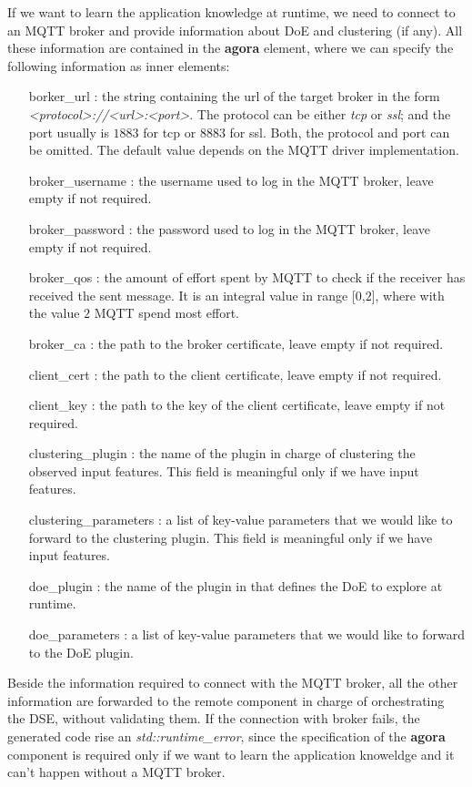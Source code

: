 If we want to learn the application knowledge at runtime, we need to connect to an MQTT broker and provide information about DoE and clustering (if any).
All these information are contained in the \textbf{agora} element, where we can specify the following information as inner elements:
\begin{itemize}
	\item[borker\_url]: the string containing the url of the target broker in the form \textit{<protocol>://<url>:<port>}. The protocol can be either \textit{tcp} or \textit{ssl}; and the port usually is $1883$ for tcp or $8883$ for ssl. Both, the protocol and port can be omitted. The default value depends on the MQTT driver implementation.
	\item[broker\_username]: the username used to log in the MQTT broker, leave empty if not required.
	\item[broker\_password]: the password used to log in the MQTT broker, leave empty if not required.
	\item[broker\_qos]: the amount of effort spent by MQTT to check if the receiver has received the sent message. It is an integral value in range [$0$,$2$], where with the value $2$ MQTT spend most effort.
	\item[broker\_ca]: the path to the broker certificate, leave empty if not required.
	\item[client\_cert]: the path to the client certificate, leave empty if not required.
	\item[client\_key]: the path to the key of the client certificate, leave empty if not required.
	\item[clustering\_plugin]: the name of the plugin in charge of clustering the observed input features. This field is meaningful only if we have input features.
	\item[clustering\_parameters]: a list of key-value parameters that we would like to forward to the clustering plugin. This field is meaningful only if we have input features.
	\item[doe\_plugin]: the name of the plugin in that defines the DoE to explore at runtime.
	\item[doe\_parameters]: a list of key-value parameters that we would like to forward to the DoE plugin.
\end{itemize}


Beside the information required to connect with the MQTT broker, all the other information are forwarded to the remote component in charge of orchestrating the DSE, without validating them.
If the connection with broker fails, the generated code rise an \textit{std::runtime\_error}, since the specification of the \textbf{agora} component is required only if we want to learn the application knoweldge and it can't happen without a MQTT broker.


